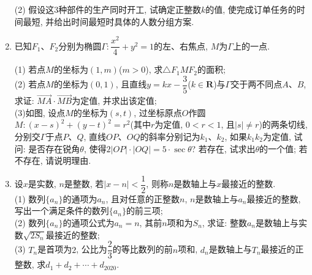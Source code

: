\documentclass[10pt,a4paper]{article}
\begin{document}
\begin{enumerate}[1.]
(2) 假设这$3$种部件的生产同时开工, 试确定正整数$k$的值, 使完成订单任务的时间最短, 并给出时间最短时具体的人数分组方案.
\item 已知$F_1$、$F_2$分别为椭圆$\Gamma :\dfrac{x^2}4+y^2=1$的左、右焦点, $M$为$\Gamma$上的一点.
\begin{center}
\end{center}
(1) 若点$M$的坐标为$(1,m)$($m>0$), 求$\triangle F_1MF_2$的面积;\\
(2) 若点$M$的坐标为$(0,1)$, 且直线$y=kx-\dfrac 35$($k\in \mathbf{R}$)与$\Gamma$交于两不同点$A$、$B$, 求证: $\overrightarrow{MA}\cdot \overrightarrow{MB}$为定值, 并求出该定值;\\
(3)如图, 设点$M$的坐标为$(s,t)$, 过坐标原点$O$作圆$M:(x-s)^2+(y-t)^2=r^2$(其中$r$为定值, $0<r<1$, 且$|s|\ne r$)的两条切线, 分别交$\Gamma$于点$P$、$Q$, 直线$OP$、$OQ$的斜率分别记为$k_1$、$k_2$, 如果$k_1k_2$为定值, 试问: 是否存在锐角$\theta$, 使得$2|OP|\cdot|OQ|=5\cdot \sec \theta$? 若存在, 试求出$\theta$的一个值; 若不存在, 请说明理由.
\item 设$x$是实数, $n$是整数, 若$|x-n|<\dfrac 12$, 则称$n$是数轴上与$x$最接近的整数.\\
(1) 数列$\{a_n\}$的通项为$a_n$, 且对任意的正整数$n$, $n$是数轴上与$a_n$最接近的整数, 写出一个满足条件的数列$\{a_n\}$的前三项;\\
(2) 数列$\{a_n\}$的通项公式为$a_n=n$, 其前$n$项和为$S_n$, 求证: 整数$a_n$是数轴上与实数$\sqrt {2S_n}$最接近的整数;\\
(3) $T_n$是首项为$2$, 公比为$\dfrac 23$的等比数列的前$n$项和, $d_n$是数轴上与$T_n$最接近的正整数, 求$d_1+d_2+\cdots +d_{2020}$.



\end{enumerate}
\end{document}
